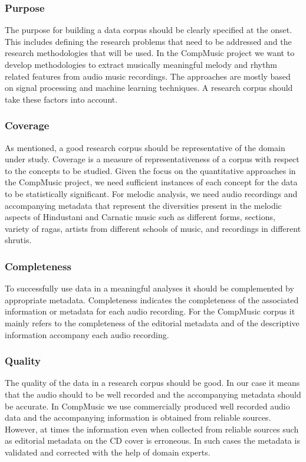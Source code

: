 \subsubsection{Purpose}

The purpose for building a data corpus should be clearly specified at the onset. This includes defining the research problems that need to be addressed and the research methodologies that will be used. In the CompMusic project we want to develop methodologies to extract musically meaningful melody and rhythm related features from audio music recordings. The approaches are mostly based on signal processing and machine learning techniques. A research corpus should take these factors into account.

\subsubsection{Coverage}

As mentioned, a good research corpus should be representative of the domain under study. Coverage is a measure of representativeness of a corpus with respect to the concepts to be studied. Given the focus on the quantitative approaches in the CompMusic project, we need sufficient instances of each concept for the data to be statistically significant. For melodic analysis, we need audio recordings and accompanying metadata that represent the diversities present in the melodic aspects of Hindustani and Carnatic music such as different forms, sections, variety of \glspl{raga}, artists from different schools of music, and recordings in different \glspl{shruti}. 

\subsubsection{Completeness}

To successfully use data in a meaningful analyses it should be complemented by appropriate metadata. Completeness indicates the completeness of the associated information or metadata for each audio recording. For the CompMusic corpus it mainly refers to the completeness of the editorial metadata and of the descriptive information accompany each audio recording. 

\subsubsection{Quality}

The quality of the data in a research corpus should be good. In our case it means that the audio should to be well recorded and the accompanying metadata should be accurate. In CompMusic we use commercially produced well recorded audio data and the accompanying information is obtained from reliable sources. However, at times the information even when collected from reliable sources such as editorial metadata on the CD cover is erroneous. In such cases the metadata is validated and corrected with the help of domain experts. 

